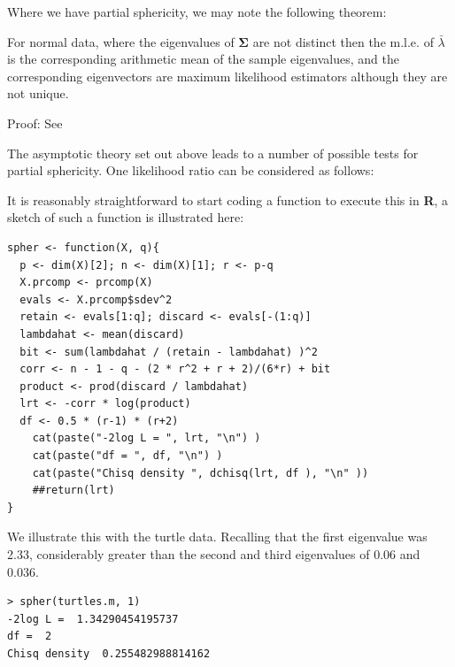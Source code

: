 
Where we have partial sphericity, we may note the following theorem:

\begin{theorem}
For normal data, where the eigenvalues of $\boldsymbol{\Sigma}$ are not distinct then the m.l.e. of $\bar{\lambda}$ is the corresponding arithmetic mean of the sample eigenvalues, and the corresponding eigenvectors are maximum likelihood estimators although they are not unique.
\end{theorem}
Proof: See \cite{Anderson:1963}

The asymptotic theory set out above leads to a number of possible tests for partial sphericity.   One likelihood ratio can be considered as follows:



It is reasonably straightforward to start coding a function to execute this in \textbf{R}, a sketch of such a function is illustrated here:
\singlespacing
\begin{verbatim}
spher <- function(X, q){
  p <- dim(X)[2]; n <- dim(X)[1]; r <- p-q
  X.prcomp <- prcomp(X)
  evals <- X.prcomp$sdev^2
  retain <- evals[1:q]; discard <- evals[-(1:q)]
  lambdahat <- mean(discard)
  bit <- sum(lambdahat / (retain - lambdahat) )^2
  corr <- n - 1 - q - (2 * r^2 + r + 2)/(6*r) + bit
  product <- prod(discard / lambdahat)
  lrt <- -corr * log(product)
  df <- 0.5 * (r-1) * (r+2)
    cat(paste("-2log L = ", lrt, "\n") )
    cat(paste("df = ", df, "\n") )
    cat(paste("Chisq density ", dchisq(lrt, df ), "\n" ))
    ##return(lrt)
}
\end{verbatim}
\onehalfspacing

We illustrate this with the turtle data.   Recalling that the first eigenvalue was 2.33, considerably greater than the second and third eigenvalues of 0.06 and 0.036.

\singlespacing
\begin{verbatim}
> spher(turtles.m, 1)
-2log L =  1.34290454195737 
df =  2 
Chisq density  0.255482988814162 
\end{verbatim}
\onehalfspacing

